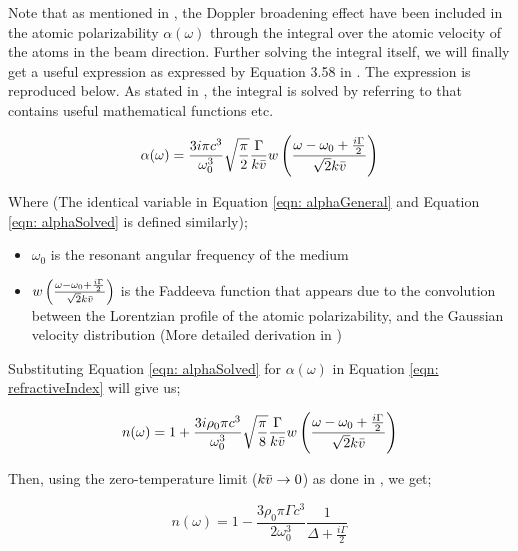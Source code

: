 Note that as mentioned in \cite{Kwong2014, Kwong2015}, the Doppler broadening effect have been included in the atomic polarizability $\alpha(\omega)$ through the integral over the atomic velocity of the atoms in the beam direction. Further solving the integral itself, we will finally get a useful expression as expressed by Equation 3.58 in \cite{Kwong2017}. The expression is reproduced below. As stated in \cite{Kwong2017}, the integral is solved by referring to \cite{10.5555/1098650} that contains useful mathematical functions etc.

\begin{equation}
    \alpha(\omega) = \frac{3i\pi c^{3}}{\omega_{0}^{3}} \sqrt{\frac{\pi}{2}} \frac{\Gamma}{k\Bar{v}} w\left(\frac{\omega - \omega_{0} + \frac{i\Gamma}{2}}{\sqrt{2}k\Bar{v}}\right)
    \label{eqn: alphaSolved}
\end{equation}

Where (The identical variable in Equation \ref{eqn: alphaGeneral} and Equation \ref{eqn: alphaSolved} is defined similarly);

\begin{itemize}
    \item $\omega_{0}$ is the resonant angular frequency of the medium
    \item $w\left(\frac{\omega - \omega_{0} + \frac{i\Gamma}{2}}{\sqrt{2}k\Bar{v}}\right)$ is the Faddeeva function that appears due to the convolution between the Lorentzian profile of the atomic polarizability, and the Gaussian velocity distribution \cite{Kwong2017} (More detailed derivation in \cite{abramowitz1965ia})
\end{itemize}

\newpage

Substituting Equation \ref{eqn: alphaSolved} for $\alpha(\omega)$ in Equation \ref{eqn: refractiveIndex} will give us;

\begin{equation}
    n(\omega) = 1 + \frac{3i\rho_{0}\pi c^{3}}{\omega_{0}^{3}} \sqrt{\frac{\pi}{8}} \frac{\Gamma}{k\Bar{v}} w\left(\frac{\omega - \omega_{0} + \frac{i\Gamma}{2}}{\sqrt{2}k\Bar{v}}\right)
\end{equation}

Then, using the zero-temperature limit ($k\Bar{v} \rightarrow 0$) as done in \cite{Kwong2017}, we get;

\begin{equation}
    n(\omega) = 1 - \frac{3\rho_{0}\pi\Gamma c^{3}}{2\omega_{0}^{3}} \frac{1}{\Delta + \frac{i\Gamma}{2}}
    \label{eqn: refractiveIndexZero}
\end{equation}

